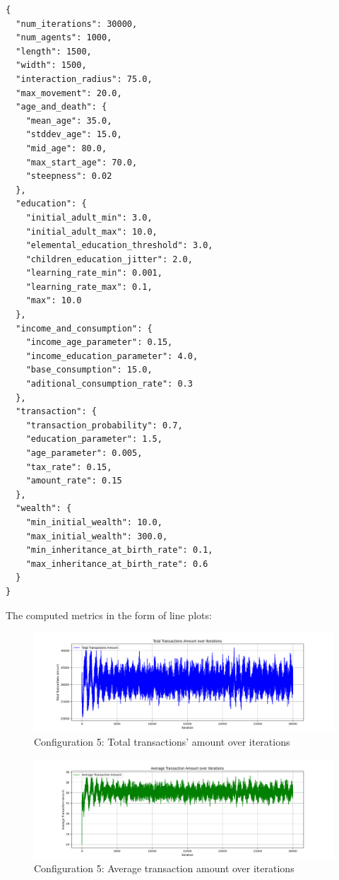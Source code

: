 \documentclass[english]{projectreport}
\begin{document}
    \begin{verbatim}
{
  "num_iterations": 30000,
  "num_agents": 1000,
  "length": 1500,
  "width": 1500,
  "interaction_radius": 75.0,
  "max_movement": 20.0,
  "age_and_death": {
    "mean_age": 35.0,
    "stddev_age": 15.0,
    "mid_age": 80.0,
    "max_start_age": 70.0,
    "steepness": 0.02
  },
  "education": {
    "initial_adult_min": 3.0,
    "initial_adult_max": 10.0,
    "elemental_education_threshold": 3.0,
    "children_education_jitter": 2.0,
    "learning_rate_min": 0.001,
    "learning_rate_max": 0.1,
    "max": 10.0
  },
  "income_and_consumption": {
    "income_age_parameter": 0.15,
    "income_education_parameter": 4.0,
    "base_consumption": 15.0,
    "aditional_consumption_rate": 0.3
  },
  "transaction": {
    "transaction_probability": 0.7,
    "education_parameter": 1.5,
    "age_parameter": 0.005,
    "tax_rate": 0.15,
    "amount_rate": 0.15
  },
  "wealth": {
    "min_initial_wealth": 10.0,
    "max_initial_wealth": 300.0,
    "min_inheritance_at_birth_rate": 0.1,
    "max_inheritance_at_birth_rate": 0.6
  }
}
    \end{verbatim}

    The computed metrics in the form of line plots:

    \begin{figure}[H]
        \centering
        \includegraphics[width=0.8\linewidth]{metrics_config5/metrics_config5_total_transactions_amount.png}
        \caption{Configuration 5: Total transactions' amount over iterations}
        \label{fig:c0-total_transactions_amount}
    \end{figure}

    \begin{figure}[H]
        \centering
        \includegraphics[width=0.8\linewidth]{metrics_config5/metrics_config5_average_transaction_amount.png}
        \caption{Configuration 5: Average transaction amount over iterations}
        \label{fig:c0-average_transaction_amount}
    \end{figure}
\end{document}
